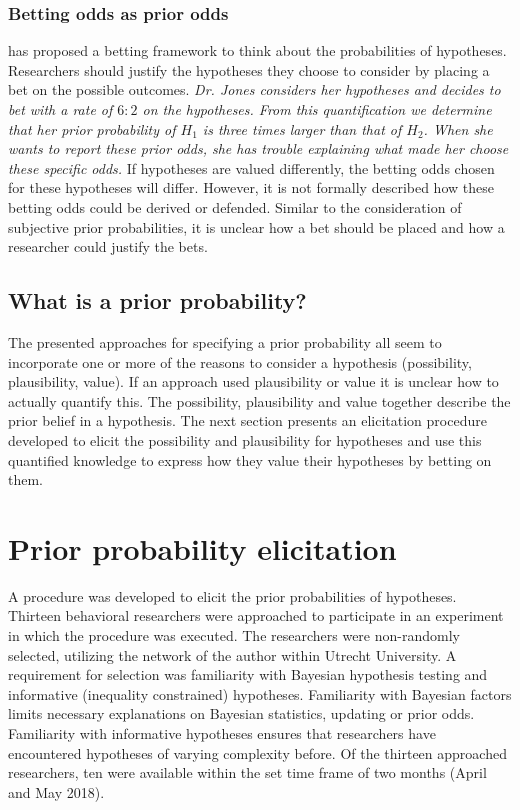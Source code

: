 \documentclass[man]{apa6}
\begin{document}
\subsubsection{Betting odds as prior odds}
 has proposed a betting framework to think about the probabilities of hypotheses.
Researchers should justify the hypotheses they choose to consider by placing a bet on the possible outcomes.
\textit{Dr. Jones considers her hypotheses and decides to bet with a rate of $6:2$ on the hypotheses.
From this quantification we determine that her prior probability of $H_1$ is three times larger than that of $H_2$.
When she wants to report these prior odds, she has trouble explaining what made her choose these specific odds.}
If hypotheses are valued differently, the betting odds chosen for these hypotheses will differ.
However, it is not formally described how these betting odds could be derived or defended.
Similar to the consideration of subjective prior probabilities, it is unclear how a bet should be placed and how a researcher could justify the bets.

\subsection{What is a prior probability?}
The presented approaches for specifying a prior probability all seem to incorporate one or more of the reasons to consider a hypothesis (possibility, plausibility, value).
If an approach used plausibility or value it is unclear how to actually quantify this.
The possibility, plausibility and value together describe the prior belief in a hypothesis.
The next section presents an elicitation procedure developed to elicit the possibility and plausibility for hypotheses and use this quantified knowledge to express how they value their hypotheses by betting on them.

\section{Prior probability elicitation}
A procedure was developed to elicit the prior probabilities of hypotheses.
Thirteen behavioral researchers were approached to participate in an experiment in which the procedure was executed.
The researchers were non-randomly selected, utilizing the network of the author within Utrecht University.
A requirement for selection was familiarity with Bayesian hypothesis testing and informative (inequality constrained) hypotheses.
Familiarity with Bayesian factors limits necessary explanations on Bayesian statistics, updating or prior odds.
Familiarity with informative hypotheses ensures that researchers have encountered hypotheses of varying complexity before.
Of the thirteen approached researchers, ten were available within the set time frame of two months (April and May 2018).
\end{document}
